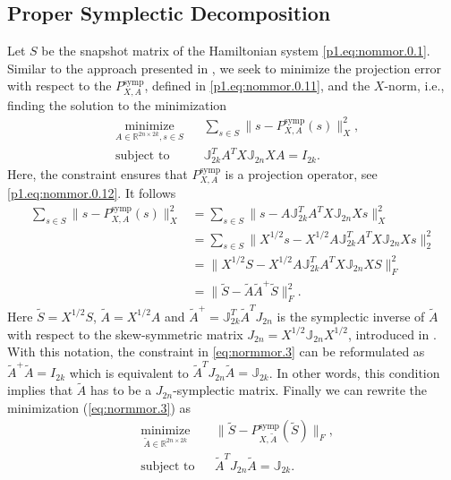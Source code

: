 \subsection{Proper Symplectic Decomposition} \label{sec:normmor.1.1}
Let $S$ be the snapshot matrix of the Hamiltonian system \eqref{p1.eq:nommor.0.1}. Similar to the approach presented in , we seek to minimize the projection error with respect to the $P_{X,A}^{\text{symp}}$, defined in \eqref{p1.eq:nommor.0.11}, and the $X$-norm, i.e., finding the solution to the minimization
\begin{equation} \label{eq:normmor.3}
\begin{aligned}
& \underset{A\in \mathbb{R}^{2n\times 2k}, s\in S}{\text{minimize}}
& & \sum_{s\in S} \| s - P_{X,A}^{\text{symp}}(s) \|_X^2, \\
& \text{subject to}
& & \mathbb J_{2k}^T A^T X \mathbb J_{2n} X A = I_{2k}.
\end{aligned}
\end{equation}
Here, the constraint ensures that $P_{X,A}^{\text{symp}}$ is a projection operator, see \eqref{p1.eq:nommor.0.12}. It follows
\begin{equation} \label{eq:normmor.4}
\begin{aligned}
	\sum_{s\in S} \| s - P_{X,A}^{\text{symp}}(s) \|_X^2 &= \sum_{s\in S} \| s - A \mathbb J_{2k}^T A^T X \mathbb J_{2n} Xs \|_X^2 \\
	&= \sum_{s\in S} \| X^{1/2}s - X^{1/2} A \mathbb J_{2k}^T A^T X \mathbb J_{2n} X s \|_2^2 \\
	&= \| X^{1/2} S - X^{1/2} A \mathbb J_{2k}^T A^T X \mathbb J_{2n} X S \|_F^2 \\
	&= \| \tilde S - \tilde A \tilde A ^+ \tilde S \|_F^2.
\end{aligned}
\end{equation}
Here $\tilde S = X^{1/2} S$, $\tilde A = X^{1/2} A$ and $\tilde A^+ = \mathbb J_{2k}^T \tilde A^T J_{2n}$ is the symplectic inverse of $\tilde A$ with respect to the skew-symmetric matrix $J_{2n} = X^{1/2} \mathbb J_{2n} X^{1/2}$, introduced in . With this notation, the constraint in \eqref{eq:normmor.3} can be reformulated as $\tilde A ^+ \tilde A = I_{2k}$ which is equivalent to $\tilde A ^T J_{2n} \tilde A = \mathbb J_{2k}$. In other words, this condition implies that $\tilde A$ has to be a $J_{2n}$-symplectic matrix. Finally we can rewrite the minimization (\ref{eq:normmor.3}) as
\begin{equation} \label{eq:normmor.5}
\begin{aligned}
& \underset{\tilde A\in \mathbb{R}^{2n\times 2k}}{\text{minimize}}
& & \| \tilde S - P^\text{symp}_{X,\tilde A}(\tilde S) \|_F, \\
& \text{subject to}
& & \tilde A^T J_{2n} \tilde A = \mathbb J_{2k}.
\end{aligned}
\end{equation}
